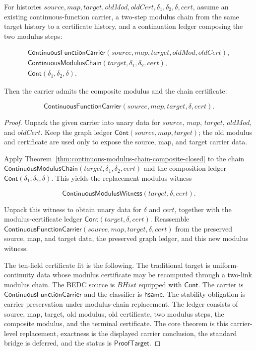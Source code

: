 \begin{theorem}
\label{thm:continuous-function-carrier-modulus-chain-replacement}
For histories $source,map,target,oldMod,oldCert,\delta_1,\delta_2,\delta,cert$,
assume an existing continuous-function carrier, a two-step modulus chain from
the same target history to a certificate history, and a continuation ledger
composing the two modulus steps:

$$
\begin{array}{l}
\mathsf{ContinuousFunctionCarrier}(source,map,target,oldMod,oldCert),
\\
\mathsf{ContinuousModulusChain}(target,\delta_1,\delta_2,cert),
\\
\mathsf{Cont}(\delta_1,\delta_2,\delta).
\end{array}
$$

Then the carrier admits the composite modulus and the chain certificate:

$$
\mathsf{ContinuousFunctionCarrier}(source,map,target,\delta,cert).
$$
\end{theorem}
\begin{proof}
Unpack the given carrier into unary data for $source$, $map$, $target$,
$oldMod$, and $oldCert$. Keep the graph ledger
$\mathsf{Cont}(source,map,target)$; the old modulus and certificate are used
only to expose the source, map, and target carrier data.

Apply Theorem~\ref{thm:continuous-modulus-chain-composite-closed} to the chain
$\mathsf{ContinuousModulusChain}(target,\delta_1,\delta_2,cert)$ and the
composition ledger $\mathsf{Cont}(\delta_1,\delta_2,\delta)$. This yields the
replacement modulus witness

$$
\mathsf{ContinuousModulusWitness}(target,\delta,cert).
$$

Unpack this witness to obtain unary data for $\delta$ and $cert$, together with
the modulus-certificate ledger $\mathsf{Cont}(target,\delta,cert)$. Reassemble
$\mathsf{ContinuousFunctionCarrier}(source,map,target,\delta,cert)$ from the
preserved source, map, and target data, the preserved graph ledger, and this new
modulus witness.

The ten-field certificate fit is the following. The traditional target is
uniform-continuity data whose modulus certificate may be recomputed through a
two-link modulus chain. The BEDC source is $BHist$ equipped with $\mathsf{Cont}$.
The carrier is $\mathsf{ContinuousFunctionCarrier}$ and the classifier is
$\mathsf{hsame}$. The stability obligation is carrier preservation under
modulus-chain replacement. The ledger consists of source, map, target, old
modulus, old certificate, two modulus steps, the composite modulus, and the
terminal certificate. The core theorem is this carrier-level replacement,
exactness is the displayed carrier conclusion, the standard bridge is deferred,
and the status is $\mathsf{ProofTarget}$.
\end{proof}

